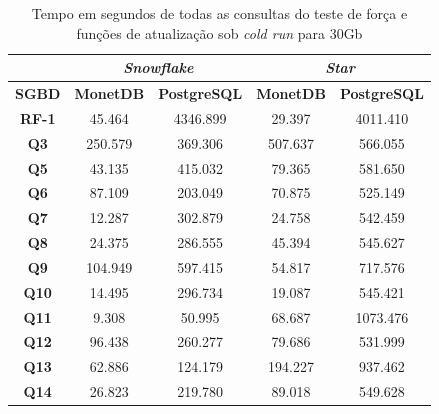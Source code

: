 \begin{table}[t]
        \centering
        \caption{Tempo em segundos de todas as consultas do teste de força e funções de atualização sob \textit{cold run} para 30Gb}
        \label{tab:queries_cold_30}
        \begin{tabular}{|c|c|c|c|c|}
        \hline
                & \multicolumn{2}{c|}{\textit{\textbf{Snowflake}}} & \multicolumn{2}{c|}{\textit{\textbf{Star}}} \\ \hline
        \textbf{SGBD}  & \textbf{MonetDB}      & \textbf{PostgreSQL}      & \textbf{MonetDB}    & \textbf{PostgreSQL}   \\ \hline
        \textbf{RF-1}  & 45.464                & 4346.899                 & 29.397              & 4011.410              \\ \hline
        \textbf{Q3}    & 250.579               & 369.306                  & 507.637             & 566.055               \\ \hline
        \textbf{Q5}    & 43.135                & 415.032                  & 79.365              & 581.650               \\ \hline
        \textbf{Q6}    & 87.109                & 203.049                  & 70.875              & 525.149               \\ \hline
        \textbf{Q7}    & 12.287                & 302.879                  & 24.758              & 542.459               \\ \hline
        \textbf{Q8}    & 24.375                & 286.555                  & 45.394              & 545.627               \\ \hline
        \textbf{Q9}    & 104.949               & 597.415                  & 54.817              & 717.576               \\ \hline
        \textbf{Q10}   & 14.495                & 296.734                  & 19.087              & 545.421               \\ \hline
        \textbf{Q11}   & 9.308                 & 50.995                   & 68.687              & 1073.476              \\ \hline
        \textbf{Q12}   & 96.438                & 260.277                  & 79.686              & 531.999               \\ \hline
        \textbf{Q13}   & 62.886                & 124.179                  & 194.227             & 937.462               \\ \hline
        \textbf{Q14}   & 26.823                & 219.780                  & 89.018              & 549.628               \\ \hline

\end{tabular}
\end{table}
